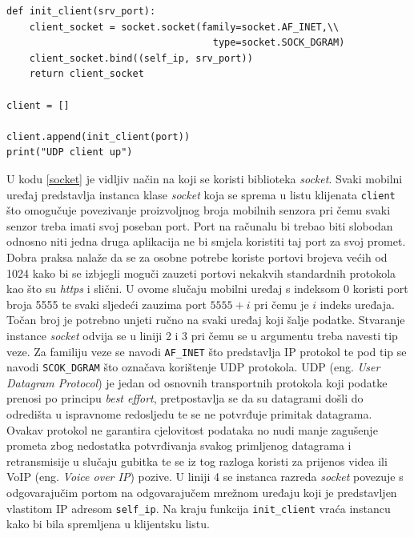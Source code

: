 \documentclass[times, utf8, diplomski]{fer}
\begin{document}
\begin{lstlisting}[caption=Ostvarivanje veze na strani klijenta, label=socket]
def init_client(srv_port):
    client_socket = socket.socket(family=socket.AF_INET,\\
                                    type=socket.SOCK_DGRAM)
    client_socket.bind((self_ip, srv_port))
    return client_socket

client = []

client.append(init_client(port))
print("UDP client up") 
\end{lstlisting}

U kodu \ref{socket} je vidljiv način na koji se koristi biblioteka \textit{socket}. Svaki mobilni uređaj predstavlja instanca klase \textit{socket} koja se sprema
u listu klijenata \texttt{client} što omogučuje povezivanje proizvoljnog broja mobilnih senzora pri čemu svaki senzor treba imati svoj poseban port. Port na računalu
bi trebao biti slobodan odnosno niti jedna druga aplikacija ne bi smjela koristiti taj port za svoj promet. Dobra praksa nalaže da se za osobne potrebe koriste portovi
brojeva većih od 1024 kako bi se izbjegli moguči zauzeti portovi nekakvih standardnih protokola kao što su \textit{https} i slični. U ovome slučaju mobilni uređaj
s indeksom 0 koristi port broja 5555 te svaki sljedeći zauzima port $5555 + i$ pri čemu je $i$ indeks uređaja. Točan broj je potrebno unjeti ručno na svaki uređaj
koji šalje podatke. Stvaranje instance \textit{socket} odvija se u liniji 2 i 3 pri čemu se u argumentu treba navesti tip veze. Za familiju veze se navodi
\texttt{AF\_INET} što predstavlja IP protokol te pod tip se navodi \texttt{SCOK\_DGRAM} što označava korištenje UDP protokola. UDP (eng. \textit{User Datagram Protocol})
je jedan od osnovnih transportnih protokola koji podatke prenosi po principu \textit{best effort}, pretpostavlja se da su datagrami došli do odredišta u ispravnome redosljedu
te se ne potvrđuje primitak datagrama. Ovakav protokol ne garantira cjelovitost podataka no nudi manje zagušenje prometa zbog nedostatka potvrđivanja svakog primljenog
datagrama i retransmisije u slučaju gubitka te se iz tog razloga koristi za prijenos videa ili VoIP (eng. \textit{Voice over IP}) pozive. U liniji 4 se instanca razreda
\textit{socket} povezuje s odgovarajučim portom na odgovarajučem mrežnom uređaju koji je predstavljen vlastitom IP adresom \texttt{self\_ip}. Na kraju funkcija
\texttt{init\_client} vraća instancu kako bi bila spremljena u klijentsku listu.
\end{document}
